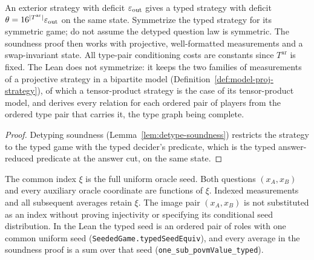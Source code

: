 \begin{lemma}
\label{lem:ar-soundness-setup}
\leanok
An exterior strategy with deficit $\varepsilon_{\mathrm{out}}$ gives a typed strategy
with deficit $\theta=16^{|T^{\mathrm{ar}}|}\varepsilon_{\mathrm{out}}$ on the same
state. Symmetrize the typed strategy for its symmetric game; do not assume
the detyped question law is symmetric. The soundness proof then works with
projective, well-formatted measurements and a swap-invariant state.
All type-pair conditioning costs are constants since $T^{\mathrm{ar}}$ is fixed.
The Lean does not symmetrize: it keeps the two families of measurements of a projective
strategy in a bipartite model (Definition~\ref{def:model-proj-strategy}), of which a
tensor-product strategy is the case of its tensor-product model, and derives every relation for
each ordered pair of players from the ordered type pair that carries it, the type graph being
complete.
\end{lemma}

\begin{proof}
\leanok
Detyping soundness (Lemma~\ref{lem:detype-soundness}) restricts the strategy to the typed game
with the typed decider's predicate, which is the typed answer-reduced predicate at the answer
cut, on the same state.
\end{proof}

\begin{definition}
\label{def:ar-seed-index}
\leanok
The common index $\xi$ is the full uniform oracle seed. Both questions
$(x_A,x_B)$ and every auxiliary oracle coordinate are functions of $\xi$.
Indexed measurements and all subsequent averages retain $\xi$.
The image pair $(x_A,x_B)$ is not substituted as an index without proving
injectivity or specifying its conditional seed distribution.
In the Lean the typed seed is an ordered pair of roles with one common uniform seed
(\texttt{SeededGame.typedSeedEquiv}), and every average in the soundness proof is a sum over
that seed (\texttt{one\_sub\_povmValue\_typed}).
\end{definition}

